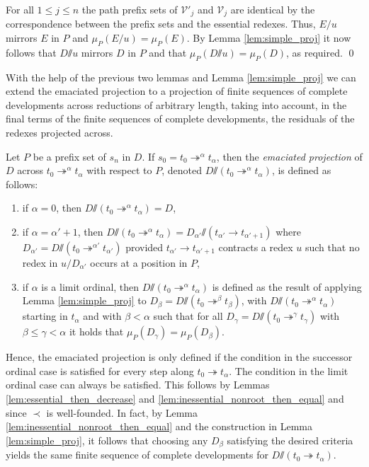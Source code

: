 \documentclass{LMCS}
\theoremstyle{definition}
\newcommand{\rew}{\rightarrow}
\newcommand{\trewt}{\twoheadrightarrow}
\newcommand{\emmy}{\mathord{\sslash}}
\newcommand{\pme}{\mu}
\newcommand{\pmep}[2]{\pme_{#1}({#2})}
\begin{document}
For all $1 \leq j \leq n$ the path prefix sets of $\mathcal{V}'_j$ and $\mathcal{V}_j$ are identical by the correspondence between the prefix sets and the essential redexes. Thus, $E/u$ mirrors $E$ in $P$ and $\pmep{P}{E/u} = \pmep{P}{E}$. By Lemma \ref{lem:simple_proj} it now follows that $D \emmy u$ mirrors $D$ in $P$ and that $\pmep{P}{D \emmy u} = \pmep{P}{D}$, as required.
\qed

With the help of the previous two lemmas and Lemma \ref{lem:simple_proj} we can extend the emaciated projection to a projection of finite sequences of complete developments across reductions of arbitrary length, taking into account, in the final terms of the finite sequences of complete developments, the residuals of the redexes projected across.

\begin{defi}
\label{def:emmybig}
Let $P$ be a prefix set of $s_n$ in $D$. If $s_0 = t_0 \trewt^\alpha t_\alpha$, then the \emph{emaciated projection} of $D$ across $t_0 \trewt^\alpha t_\alpha$ with respect to $P$, denoted $D \emmy (t_0 \trewt^\alpha t_\alpha)$, is defined as follows:
\begin{enumerate}[(1)]
\item
if $\alpha = 0$, then $D \emmy (t_0 \trewt^\alpha t_\alpha) = D$,
\item
if $\alpha = \alpha' + 1$, then  $D \emmy (t_0 \trewt^\alpha t_\alpha) = D_{\alpha'} \emmy (t_{\alpha'} \rew t_{\alpha' + 1})$ where $D_{\alpha'} = D \emmy (t_0 \trewt^{\alpha'} t_{\alpha'})$ provided $t_{\alpha'} \rew t_{\alpha' + 1}$ contracts a redex $u$ such that no redex in $u / D_{\alpha'}$ occurs at a position in $P$,
\item
if $\alpha$ is a limit ordinal, then $D \emmy (t_0 \trewt^\alpha t_\alpha)$ is defined as the result of applying Lemma \ref{lem:simple_proj} to $D_\beta = D \emmy (t_0 \trewt^\beta t_\beta)$, with $D \emmy (t_0 \trewt^\alpha t_\alpha)$ starting in $t_\alpha$ and with $\beta < \alpha$ such that for all $D_\gamma = D \emmy (t_0 \trewt^\gamma t_\gamma)$ with $\beta \leq \gamma < \alpha$ it holds that $\pmep{P}{D_\gamma} = \pmep{P}{D_\beta}$.
\end{enumerate}
\end{defi}

\noindent Hence, the emaciated projection is only defined if the condition in the successor ordinal case is satisfied for every step along $t_0 \trewt t_\alpha$. The condition in the limit ordinal case can always be satisfied. This follows by Lemmas \ref{lem:essential_then_decrease} and \ref{lem:inessential_nonroot_then_equal} and since $\prec$ is well-founded. In fact, by Lemma \ref{lem:inessential_nonroot_then_equal} and the construction in Lemma \ref{lem:simple_proj}, it follows that choosing any $D_\beta$ satisfying the desired criteria yields the same finite sequence of complete developments for $D \emmy (t_0 \trewt t_\alpha)$.
\end{document}
